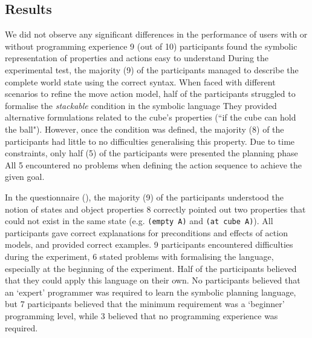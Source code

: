 \subsection{Results}
We did not observe any significant differences in the performance of users with or without programming experience
9 (out of 10) participants found the symbolic representation of properties and actions easy to understand
During the experimental test, the majority (9) of the participants managed to describe the complete world state using the correct syntax.
When faced with different scenarios to refine the move action model, half of the participants struggled to formalise the \textit{stackable} condition in the symbolic language
They provided alternative formulations related to the cube's properties (``if the cube can hold the ball").
However, once the condition was defined, the majority (8) of the participants had little to no difficulties generalising this property.
Due to time constraints, only half (5) of the participants were presented the planning phase
All 5 encountered no problems when defining the action sequence to achieve the given goal.

In the questionnaire (), the majority (9) of the participants understood the notion of states and object properties
8 correctly pointed out two properties that could not exist in the same state (e.g. \texttt{(empty A)} and \texttt{(at cube A)}).
All participants gave correct explanations for preconditions and effects of action models, and provided correct examples.
9 participants encountered difficulties during the experiment, 6 stated problems with formalising the language, especially at the beginning of the experiment.
Half of the participants believed that they could apply this language on their own.
No participants believed that an `expert' programmer was required to learn the symbolic planning language, but 7 participants believed that the minimum requirement was a `beginner' programming level, while 3 believed that no programming experience was required.

